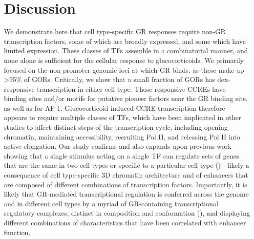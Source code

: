 \documentclass{article}
\begin{document}
{\section*{Discussion}
We demonstrate here that cell type-specific GR responses require non-GR transcription factors, some of which are broadly expressed, and some which have limited expression. These classes of TFs assemble in a combinatorial manner, and none alone is sufficient for the cellular response to glucocorticoids. We primarily focused on the non-promoter genomic loci at which GR binds, as these make up >95\% of GORs. Critically, we show that a small fraction of GORs has dex-responsive transcription in either cell type. Those responsive CCREs have binding sites and/or motifs for putative pioneer factors near the GR binding site, as well as for AP-1. Glucocorticoid-induced CCRE transcription therefore appears to require multiple classes of TFs, which have been implicated in other studies to affect distinct steps of the transcription cycle, including opening chromatin, maintaining accessibility, recruiting Pol II, and releasing Pol II into active elongation. Our study confirms and also expands upon previous work showing that a single stimulus acting on a single TF can regulate sets of genes that are the same in two cell types or specific to a particular cell type (\cite{gertz_distinct_2013, weikum_glucocorticoid_2017, vihervaara_molecular_2018})—likely a consequence of cell type-specific 3D chromatin architecture and of enhancers that are composed of different combinations of transcription factors. Importantly, it is likely that GR-mediated transcriptional regulation is conferred across the genome and in different cell types by a myriad of GR-containing transcriptional regulatory complexes, distinct in composition and conformation (\cite{weikum_glucocorticoid_2017}), and displaying different combinations of characteristics that have been correlated with enhancer function.
	
}
\end{document}

